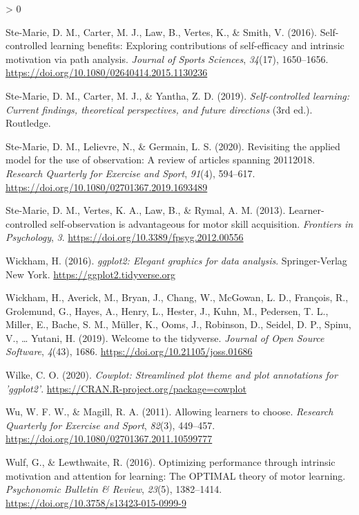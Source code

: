 \documentclass[
  english,
  man,floatsintext]{apa7}
\newlength{\cslhangindent}
\newenvironment{CSLReferences}[2] %
 {%
  \setlength{\parindent}{0pt}
  \ifodd #1 \everypar{\setlength{\hangindent}{\cslhangindent}}\ignorespaces\fi
  \ifnum #2 > 0
  \setlength{\parskip}{#2\baselineskip}
  \fi
 }%
 {}
\begin{document}
\begin{CSLReferences}{1}{0}
\leavevmode\hypertarget{ref-ste-marie2016}{}%
Ste-Marie, D. M., Carter, M. J., Law, B., Vertes, K., \& Smith, V. (2016). Self-controlled learning benefits: Exploring contributions of self-efficacy and intrinsic motivation via path analysis. \emph{Journal of Sports Sciences}, \emph{34}(17), 1650--1656. \url{https://doi.org/10.1080/02640414.2015.1130236}

\leavevmode\hypertarget{ref-ste-marie2019}{}%
Ste-Marie, D. M., Carter, M. J., \& Yantha, Z. D. (2019). \emph{Self-controlled learning: Current findings, theoretical perspectives, and future directions} (3rd ed.). Routledge.

\leavevmode\hypertarget{ref-ste-marie2020}{}%
Ste-Marie, D. M., Lelievre, N., \& Germain, L. S. (2020). Revisiting the applied model for the use of observation: A review of articles spanning 2011{{}}2018. \emph{Research Quarterly for Exercise and Sport}, \emph{91}(4), 594--617. \url{https://doi.org/10.1080/02701367.2019.1693489}

\leavevmode\hypertarget{ref-ste-marie2013}{}%
Ste-Marie, D. M., Vertes, K. A., Law, B., \& Rymal, A. M. (2013). Learner-controlled self-observation is advantageous for motor skill acquisition. \emph{Frontiers in Psychology}, \emph{3}. \url{https://doi.org/10.3389/fpsyg.2012.00556}

\leavevmode\hypertarget{ref-R-ggplot2}{}%
Wickham, H. (2016). \emph{ggplot2: Elegant graphics for data analysis}. Springer-Verlag New York. \url{https://ggplot2.tidyverse.org}

\leavevmode\hypertarget{ref-R-tidyverse}{}%
Wickham, H., Averick, M., Bryan, J., Chang, W., McGowan, L. D., François, R., Grolemund, G., Hayes, A., Henry, L., Hester, J., Kuhn, M., Pedersen, T. L., Miller, E., Bache, S. M., Müller, K., Ooms, J., Robinson, D., Seidel, D. P., Spinu, V., \ldots{} Yutani, H. (2019). Welcome to the {tidyverse}. \emph{Journal of Open Source Software}, \emph{4}(43), 1686. \url{https://doi.org/10.21105/joss.01686}

\leavevmode\hypertarget{ref-R-cowplot}{}%
Wilke, C. O. (2020). \emph{Cowplot: Streamlined plot theme and plot annotations for 'ggplot2'}. \url{https://CRAN.R-project.org/package=cowplot}

\leavevmode\hypertarget{ref-wu2011}{}%
Wu, W. F. W., \& Magill, R. A. (2011). Allowing learners to choose. \emph{Research Quarterly for Exercise and Sport}, \emph{82}(3), 449--457. \url{https://doi.org/10.1080/02701367.2011.10599777}

\leavevmode\hypertarget{ref-wulf2016}{}%
Wulf, G., \& Lewthwaite, R. (2016). Optimizing performance through intrinsic motivation and attention for learning: The OPTIMAL theory of motor learning. \emph{Psychonomic Bulletin \& Review}, \emph{23}(5), 1382--1414. \url{https://doi.org/10.3758/s13423-015-0999-9}


\end{CSLReferences}
\end{document}
